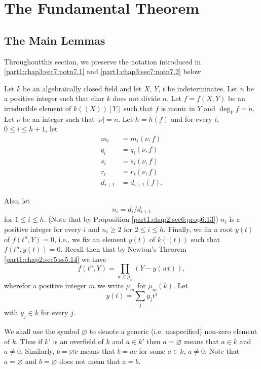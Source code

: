 
\chapter{The Fundamental Theorem}\label{part1:chap3}

\setcounter{section}{6}
\section{The Main Lemmas} \label{part1:chap3:sec7}

Throughout\pageoriginale this section, we preserve the notation
introduced in \ref{part1:chap3:sec7:notn7.1} and
\ref{part1:chap3:sec7:notn7.2} below 

\begin{notn}\label{part1:chap3:sec7:notn7.1}
Let $k$ be an algebraically closed field and let $X$, $Y$, $t$ be indeterminates. Let $n$ be a positive integer such that char $k$ does not divide $n$. Let $f= f(X, Y)$ be an irreducible element of $k ((X))[Y]$ such that $f$ is monic in $Y$ and $\deg_Y f=n$. Let $\nu$ be an integer such that $|\nu|=n$. Let $h = h(f)$ and for every $i$, $0 \leq i \leq h+1$, let
\begin{align*}
  m_i & = m_i (\nu, f)\\
  q_i & = q_i (\nu, f)\\
  s_i & = s_i (\nu, f)\\
  r_i & = r_i (\nu, f)\\
d_{i+1} & = d_{i+1}(f).
\end{align*}
\end{notn}

Also, let
$$
n_i= d_i/d_{i+1}
$$
for $1 \leq i \leq h$. (Note that by Proposition
\ref{part1:chap2:sec6:prop6.13}) $n_i$ is a positive integer for every
$i$ and $n_i \geq 2$ for $2 \leq i \leq h$. Finally, we fix a root
$y(t)$ of $f(t^n, Y)=0$, i.e., we fix an element $y(t)$ of $k((t))$
such that $f(t^n, y(t))=0$. Recall then that by Newton's Theorem
\ref{part1:chap2:sec5:ss5.14} we have 
$$
f(t^n, Y) = \prod_{w \in \mu_n} (Y- y(wt)),
$$
where\pageoriginale for a positive integer $m$ we write $\mu_m$ for $\mu_m(k)$. Let
$$
y(t) = \sum_{j} y_j t^j
$$
with $y_j \in k$ for every $j$.

\begin{notn}\label{part1:chap3:sec7:notn7.2}
We shall use the symbol $\diameter$ to denote a generic (i.e. unspecified) non-zero element of $k$. Thus if $k'$ is an overfield of $k$ and $a \in k'$ then $a = \diameter$ means that $a \in k$ and $a \neq 0$. Similarly, $b= \diameter c$ means that $b= ac$ for some $a \in k$, $a \neq 0$. Note that $a= \diameter$ and $b= \diameter$ does not mean that $a=b$.
\end{notn}


